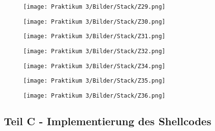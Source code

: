 \documentclass[12pt]{article}
\begin{document}
\begin{figure}[htbp]
    \centering
    \texttt{[image: Praktikum 3/Bilder/Stack/Z29.png]}
\end{figure}
\newpage

\begin{figure}[htbp]
    \centering
    \texttt{[image: Praktikum 3/Bilder/Stack/Z30.png]}
\end{figure}
\newpage

\begin{figure}[htbp]
    \centering
    \texttt{[image: Praktikum 3/Bilder/Stack/Z31.png]}
\end{figure}
\newpage

\begin{figure}[htbp]
    \centering
    \texttt{[image: Praktikum 3/Bilder/Stack/Z32.png]}
\end{figure}
\newpage

\begin{figure}[htbp]
    \centering
    \texttt{[image: Praktikum 3/Bilder/Stack/Z34.png]}
\end{figure}
\newpage

\begin{figure}[htbp]
    \centering
    \texttt{[image: Praktikum 3/Bilder/Stack/Z35.png]}
\end{figure}
\newpage

\begin{figure}[htbp]
    \centering
    \texttt{[image: Praktikum 3/Bilder/Stack/Z36.png]}
\end{figure}
\newpage

\subsection{Teil C - Implementierung des Shellcodes}
\end{document}

